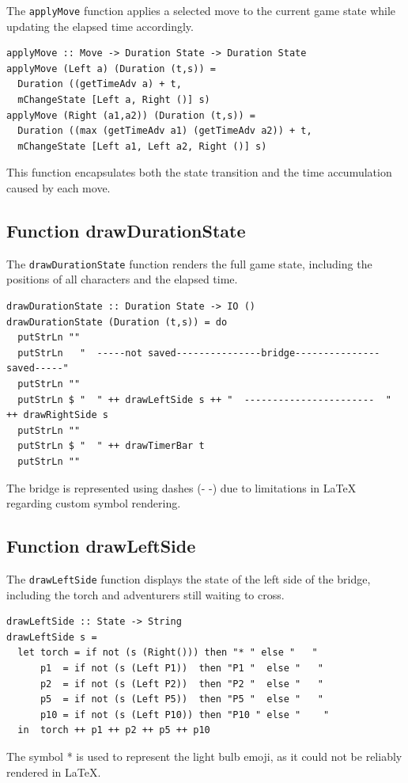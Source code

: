 \documentclass[a4paper,12pt]{report}
\begin{document}
The \texttt{applyMove} function applies a selected move to the current game state while updating the elapsed time accordingly.

\begin{verbatim}
applyMove :: Move -> Duration State -> Duration State
applyMove (Left a) (Duration (t,s)) =
  Duration ((getTimeAdv a) + t,
  mChangeState [Left a, Right ()] s)
applyMove (Right (a1,a2)) (Duration (t,s)) =
  Duration ((max (getTimeAdv a1) (getTimeAdv a2)) + t,
  mChangeState [Left a1, Left a2, Right ()] s)
\end{verbatim}

This function encapsulates both the state transition and the time accumulation caused by each move.

\subsection{Function drawDurationState}

The \texttt{drawDurationState} function renders the full game state, including the positions of all characters and the elapsed time.

\begin{verbatim}
drawDurationState :: Duration State -> IO ()
drawDurationState (Duration (t,s)) = do
  putStrLn ""
  putStrLn   "  -----not saved---------------bridge---------------saved-----"
  putStrLn ""                             
  putStrLn $ "  " ++ drawLeftSide s ++ "  -----------------------  " ++ drawRightSide s
  putStrLn ""
  putStrLn $ "  " ++ drawTimerBar t
  putStrLn ""
\end{verbatim}
The bridge is represented using dashes (- -) due to limitations in LaTeX regarding custom symbol rendering.
\subsection{Function drawLeftSide}

The \texttt{drawLeftSide} function displays the state of the left side of the bridge, including the torch and adventurers still waiting to cross.

\begin{verbatim}
drawLeftSide :: State -> String
drawLeftSide s =
  let torch = if not (s (Right())) then "* " else "   "
      p1  = if not (s (Left P1))  then "P1 "  else "   "
      p2  = if not (s (Left P2))  then "P2 "  else "   "
      p5  = if not (s (Left P5))  then "P5 "  else "   "
      p10 = if not (s (Left P10)) then "P10 " else "    "
  in  torch ++ p1 ++ p2 ++ p5 ++ p10
\end{verbatim}
The symbol * is used to represent the light bulb emoji, as it could not be reliably rendered in LaTeX.
\end{document}
